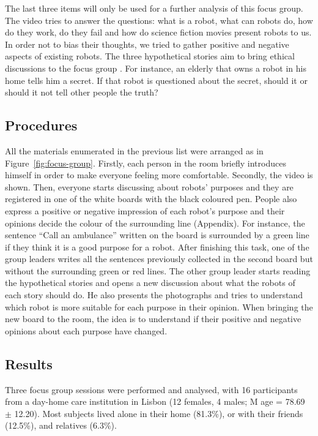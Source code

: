 The last three items will only be used for a further analysis of this focus group.
The video tries to answer the questions: what is a robot, what can robots do, how do they work, do they fail and how do science fiction movies present robots to us.
In order not to bias their thoughts, we tried to gather positive and negative aspects of existing robots.
The three hypothetical stories aim to bring ethical discussions to the focus group \cite{Kahn2006,Should2010}.
For instance, an elderly that owns a robot in his home tells him a secret.
If that robot is questioned about the secret, should it or should it not tell other people the truth?

\subsection{Procedures}
All the materials enumerated in the previous list were arranged as in Figure~\ref{fig:focus-group}.
Firstly, each person in the room briefly introduces himself in order to make everyone feeling more comfortable.
Secondly, the video is shown.
Then, everyone starts discussing about robots' purposes and they are registered in one of the white boards with the black coloured pen.
People also express a positive or negative impression of each robot's purpose and their opinions decide the colour of the surrounding line (Appendix).
For instance, the sentence ``Call an ambulance'' written on the board is surrounded by a green line if they think it is a good purpose for a robot.
After finishing this task, one of the group leaders writes all the sentences previously collected in the second board but without the surrounding green or red lines.
The other group leader starts reading the hypothetical stories and opens a new discussion about what the robots of each story should do.
He also presents the photographs and tries to understand which robot is more suitable for each purpose in their opinion.
When bringing the new board to the room, the idea is to understand if their positive and negative opinions about each purpose have changed.


\subsection{Results}

Three focus group sessions were performed and analysed, with 16 participants from a day-home care institution in Lisbon (12 females, 4 males; M age = 78.69 $\pm$ 12.20).
Most subjects lived alone in their home (81.3\%), or with their friends (12.5\%), and relatives (6.3\%).

